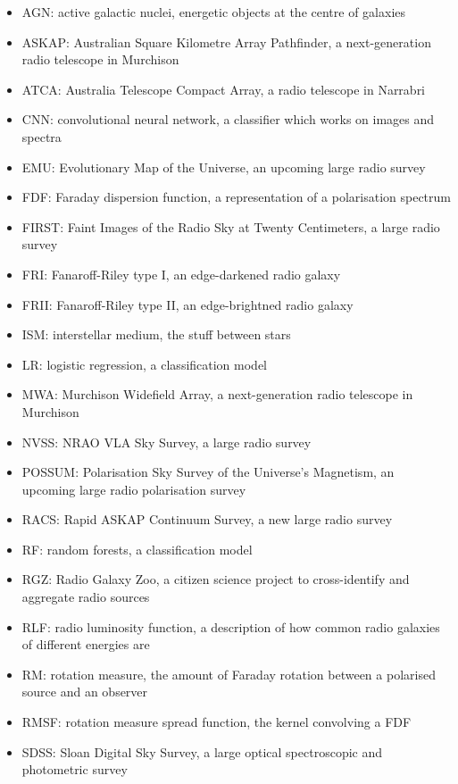 \documentclass[11pt, a4paper]{book}
\begin{document}
\begin{itemize}
    \item AGN: active galactic nuclei, energetic objects at the centre of galaxies
    \item ASKAP: Australian Square Kilometre Array Pathfinder, a next-generation radio telescope in Murchison
    \item ATCA: Australia Telescope Compact Array, a radio telescope in Narrabri
    \item CNN: convolutional neural network, a classifier which works on images and spectra
    \item EMU: Evolutionary Map of the Universe, an upcoming large radio survey
    \item FDF: Faraday dispersion function, a representation of a polarisation spectrum
    \item FIRST: Faint Images of the Radio Sky at Twenty Centimeters, a large radio survey
    \item FRI: Fanaroff-Riley type I, an edge-darkened radio galaxy
    \item FRII: Fanaroff-Riley type II, an edge-brightned radio galaxy
    \item ISM: interstellar medium, the stuff between stars
    \item LR: logistic regression, a classification model
    \item MWA: Murchison Widefield Array, a next-generation radio telescope in Murchison
    \item NVSS: NRAO VLA Sky Survey, a large radio survey
    \item POSSUM: Polarisation Sky Survey of the Universe's Magnetism, an upcoming large radio polarisation survey
    \item RACS: Rapid ASKAP Continuum Survey, a new large radio survey
    \item RF: random forests, a classification model
    \item RGZ: Radio Galaxy Zoo, a citizen science project to cross-identify and aggregate radio sources
    \item RLF: radio luminosity function, a description of how common radio galaxies of different energies are
    \item RM: rotation measure, the amount of Faraday rotation between a polarised source and an observer
    \item RMSF: rotation measure spread function, the kernel convolving a FDF
    \item SDSS: Sloan Digital Sky Survey, a large optical spectroscopic and photometric survey

\end{itemize}
\end{document}
